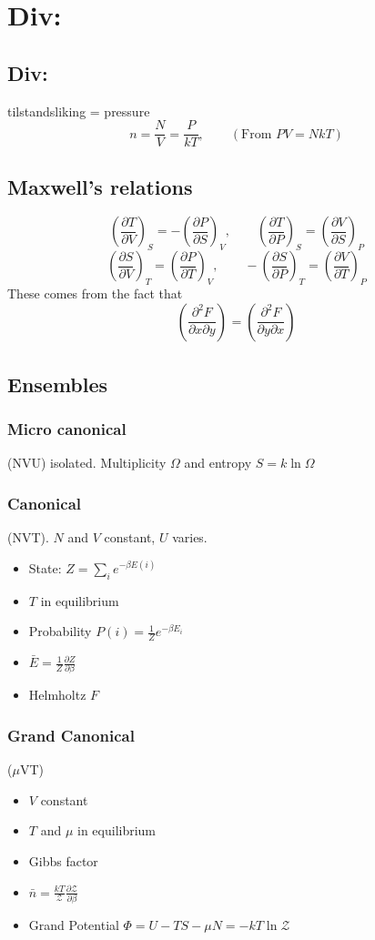 \documentclass[a4paper,norsk, 10pt]{article}
\newcommand{\pd}[3]{\left(\frac{\partial #1}{\partial #2}\right)_{#3}}
\begin{document}
\section{Div:}
\subsection{Div:}
tilstandsliking = pressure
\begin{equation}
n = \frac{N}{V} = \frac{P}{kT},\qquad (\text{From }PV = NkT)
\end{equation}
\subsection{Maxwell's relations}
\begin{equation}
\pd{T}{V}{S} = -\pd{P}{S}{V}, \qquad \pd{T}{P}{S} = \pd{V}{S}{P}
\end{equation}
\begin{equation}
\pd{S}{V}{T} = \pd{P}{T}{V}, \qquad -\pd{S}{P}{T} = \pd{V}{T}{P}
\end{equation}
These comes from the fact that 
\begin{equation}
\pd{^2F}{x\partial y}{} = \pd{^2F}{y\partial x}{}
\end{equation}
\subsection{Ensembles}
\subsubsection{Micro canonical}
(NVU) isolated. Multiplicity $\Omega$ and entropy $S = k\ln\Omega$
\subsubsection{Canonical}
(NVT). $N$ and $V$ constant, $U$ varies.
\begin{itemize}
\item State: $Z = \sum_i e^{-\beta E(i)}$
\item $T$ in equilibrium
\item Probability $P(i) = \frac{1}{Z}e^{-\beta E_i}$
\item $\bar{E} = \frac{1}{Z}\frac{\partial Z}{\partial \beta}$
\item Helmholtz $F$
\end{itemize}
\subsubsection{Grand Canonical}
($\mu$VT)
\begin{itemize}
\item $V$ constant
\item $T$ and $\mu$ in equilibrium
\item Gibbs factor
\item $\bar{n} = \frac{kT}{\mathcal{Z}}\frac{\partial \mathcal{Z}}{\partial \beta}$
\item Grand Potential $\Phi = U - TS - \mu N = -kT\ln \mathcal{Z}$
\end{itemize}
\end{document}
